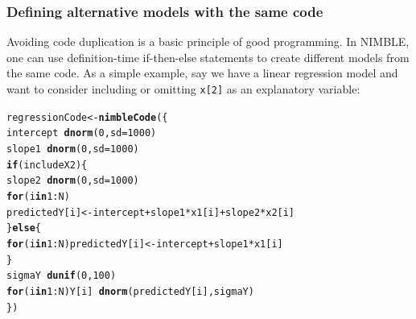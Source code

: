 \documentclass[12pt,oneside]{book}\usepackage[]{graphicx}\usepackage[]{color}
\makeatletter
\newcommand{\hlnum}[1]{\textcolor[rgb]{0.686,0.059,0.569}{#1}}%
\newcommand{\hlopt}[1]{\textcolor[rgb]{0,0,0}{#1}}%
\newcommand{\hlstd}[1]{\textcolor[rgb]{0.345,0.345,0.345}{#1}}%
\newcommand{\hlkwa}[1]{\textcolor[rgb]{0.161,0.373,0.58}{\textbf{#1}}}%
\newcommand{\hlkwb}[1]{\textcolor[rgb]{0.69,0.353,0.396}{#1}}%
\newcommand{\hlkwc}[1]{\textcolor[rgb]{0.333,0.667,0.333}{#1}}%
\newcommand{\hlkwd}[1]{\textcolor[rgb]{0.737,0.353,0.396}{\textbf{#1}}}%
\newenvironment{kframe}{%
 \def\at@end@of@kframe{}%
 \ifinner\ifhmode%
  \def\at@end@of@kframe{\end{minipage}}%
  \begin{minipage}{\columnwidth}%
 \fi\fi%
 \def\FrameCommand##1{\hskip\@totalleftmargin \hskip-\fboxsep
 \colorbox{shadecolor}{##1}\hskip-\fboxsep
     \hskip-\linewidth \hskip-\@totalleftmargin \hskip\columnwidth}%
 \MakeFramed {\advance\hsize-\width
   \@totalleftmargin\z@ \linewidth\hsize
   \@setminipage}}%
 {\par\unskip\endMakeFramed%
 \at@end@of@kframe}
\newenvironment{knitrout}{}{} %
\def\cd#1{\texttt{#1}}
\makeatother
\begin{document}
\subsubsection{Defining alternative models with the same code}
\label{sec:defin-altern-models}

Avoiding code duplication is a basic principle of good programming. In
NIMBLE, one can use definition-time if-then-else statements to create
different models from the same code.  As a simple example, say we have
a linear regression model and want to consider including or omitting
\cd{x[2]} as an explanatory variable:

\begin{knitrout}
\color{fgcolor}\begin{kframe}
\begin{alltt}
\hlstd{regressionCode} \hlkwb{<-} \hlkwd{nimbleCode}\hlstd{(\{}
    \hlstd{intercept} \hlopt{~} \hlkwd{dnorm}\hlstd{(}\hlnum{0}\hlstd{,} \hlkwc{sd} \hlstd{=} \hlnum{1000}\hlstd{)}
    \hlstd{slope1} \hlopt{~} \hlkwd{dnorm}\hlstd{(}\hlnum{0}\hlstd{,} \hlkwc{sd} \hlstd{=} \hlnum{1000}\hlstd{)}
    \hlkwa{if}\hlstd{(includeX2) \{}
        \hlstd{slope2} \hlopt{~} \hlkwd{dnorm}\hlstd{(}\hlnum{0}\hlstd{,} \hlkwc{sd} \hlstd{=} \hlnum{1000}\hlstd{)}
        \hlkwa{for}\hlstd{(i} \hlkwa{in} \hlnum{1}\hlopt{:}\hlstd{N)}
            \hlstd{predictedY[i]} \hlkwb{<-} \hlstd{intercept} \hlopt{+} \hlstd{slope1} \hlopt{*} \hlstd{x1[i]} \hlopt{+} \hlstd{slope2} \hlopt{*} \hlstd{x2[i]}
    \hlstd{\}} \hlkwa{else} \hlstd{\{}
        \hlkwa{for}\hlstd{(i} \hlkwa{in} \hlnum{1}\hlopt{:}\hlstd{N) predictedY[i]} \hlkwb{<-} \hlstd{intercept} \hlopt{+} \hlstd{slope1} \hlopt{*} \hlstd{x1[i]}
    \hlstd{\}}
    \hlstd{sigmaY} \hlopt{~} \hlkwd{dunif}\hlstd{(}\hlnum{0}\hlstd{,} \hlnum{100}\hlstd{)}
    \hlkwa{for}\hlstd{(i} \hlkwa{in} \hlnum{1}\hlopt{:}\hlstd{N) Y[i]} \hlopt{~} \hlkwd{dnorm}\hlstd{(predictedY[i], sigmaY)}
\hlstd{\})}


\end{alltt}
\end{kframe}
\end{knitrout}
\end{document}
